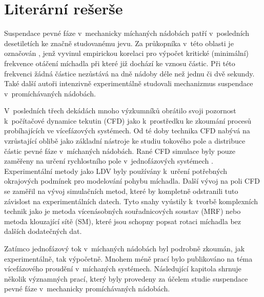 \chapter{Literární rešerše}
Suspendace pevné fáze v~mechanicky míchaných nádobách patří v~posledních desetiletích ke značně studovanému jevu. Za průkopníka v~této oblasti je označován \citet{zwi58}, jenž vyvinul empirickou korelaci pro výpočet kritické (minimální) frekvence otáčení míchadla při které již dochází ke vznosu částic. Při této frekvenci žádná částice nezůstává na dně nádoby déle než jednu či dvě sekundy. Také další autoři \citep{nie68,bal78,arm98} intenzivně experimentálně studovali mechanizmus suspendace v~promíchávaných nádobách. 

V~posledních třech dekádách mnoho výzkumníků obrátilo svoji pozornost k~počítačové dynamice tekutin (CFD) jako k~prostředku ke zkoumání procesů probíhajících ve vícefázových systémech. Od té doby technika CFD nabývá na vzrůstající oblibě jako základní nástroje ke studiu tokového pole a distribuce částic pevné fáze v~míchaných nádobách. Rané CFD simulace byly pouze zaměřeny na určení rychlostního pole v~jednofázových systémech \citep{kre91}. Experimentální metody jako LDV byly používány k~určení potřebných okrajových podmínek pro modelování pohybu míchadla. Další vývoj na poli CFD se zaměřil na vývoj simulačních metod, které by kompletně odstranili tuto závislost na experimentálních datech. Tyto snahy vyústily k~tvorbě komplexních technik jako je metoda vícenásobných souřadnicových soustav (MRF) nebo metoda klouzající sítě (SM), které jsou schopny popsat rotaci míchadla bez dalších dodatečných dat.  

Zatímco jednofázový tok v~míchaných nádobách byl podrobně zkoumán, jak experimentálně, tak výpočetně. Mnohem méně prací bylo publikováno na téma vícefázového proudění v~míchaných systémech. Následující kapitola shrnuje několik významných prací, který byly provedeny za účelem studie suspendace pevné fáze v~mechanicky promíchávaných nádobách.
  
